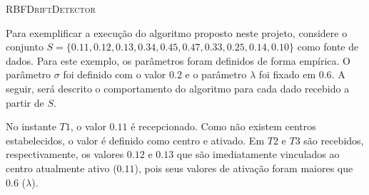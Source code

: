 \documentclass[qual, classic, a4paper]{ufbathesis}
\begin{document}
\vspace{5pt}
\begin{algorithm}[H]
    \SetAlgoLined

    \label{alg:algoritmo} 
    \caption{\textsc{RBFDriftDetector}}
\end{algorithm}
\vspace{5pt}

Para exemplificar a execução do algoritmo proposto neste projeto, considere o conjunto $S = \{0.11, 0.12, 0.13, 0.34, 0.45, 0.47, 0.33, 0.25, 0.14, 0.10\}$ como fonte de dados.
Para este exemplo, os parâmetros foram definidos de forma empírica. O parâmetro \textit{$\sigma$} foi definido com o valor $0.2$ e o parâmetro \textit{$\lambda$} foi fixado em $0.6$.
A seguir, será descrito o comportamento do algoritmo para cada dado recebido a partir de $S$.

No instante $T1$, o valor $0.11$ é recepcionado. Como não existem centros estabelecidos, o valor é definido como centro e ativado.
Em $T2$ e $T3$ são recebidos, respectivamente, os valores $0.12$ e $0.13$ que são imediatamente vinculados ao centro atualmente ativo ($0.11$), pois seus valores de ativação foram maiores que $0.6$ ($\lambda$).
\end{document}
